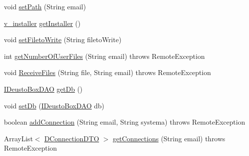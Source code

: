 \begin{DoxyCompactItemize}
\item 
void \mbox{\hyperlink{classes_1_1deusto_1_1bspq18_1_1e6_1_1_deusto_box_1_1_server_1_1remote_1_1_deusto_box_remote_service_a713a21168a4d89ed58ebfe63e4a38739}{set\+Path}} (String email)
\item 
\mbox{\hyperlink{classes_1_1deusto_1_1bspq18_1_1e6_1_1_deusto_box_1_1_server_1_1gui_1_1v__installer}{v\+\_\+installer}} \mbox{\hyperlink{classes_1_1deusto_1_1bspq18_1_1e6_1_1_deusto_box_1_1_server_1_1remote_1_1_deusto_box_remote_service_ae2e8dc87a5f16722a6bec1a6ff87ed52}{get\+Installer}} ()
\item 
void \mbox{\hyperlink{classes_1_1deusto_1_1bspq18_1_1e6_1_1_deusto_box_1_1_server_1_1remote_1_1_deusto_box_remote_service_a376f731a1b4406b3aeaa65e60e62497d}{set\+Fileto\+Write}} (String fileto\+Write)
\item 
int \mbox{\hyperlink{classes_1_1deusto_1_1bspq18_1_1e6_1_1_deusto_box_1_1_server_1_1remote_1_1_deusto_box_remote_service_a2425af40ab1d0aaa9de2954d5d841807}{get\+Number\+Of\+User\+Files}} (String email)  throws Remote\+Exception 
\item 
void \mbox{\hyperlink{classes_1_1deusto_1_1bspq18_1_1e6_1_1_deusto_box_1_1_server_1_1remote_1_1_deusto_box_remote_service_ae5c7e627a97bbc28925516e8af17fbc6}{Receive\+Files}} (String file, String email)  throws Remote\+Exception 
\item 
\mbox{\hyperlink{interfacees_1_1deusto_1_1bspq18_1_1e6_1_1_deusto_box_1_1_server_1_1jdo_1_1dao_1_1_i_deusto_box_d_a_o}{I\+Deusto\+Box\+D\+AO}} \mbox{\hyperlink{classes_1_1deusto_1_1bspq18_1_1e6_1_1_deusto_box_1_1_server_1_1remote_1_1_deusto_box_remote_service_a811146764b30a4eb510186a5386cfb9f}{get\+Db}} ()
\item 
void \mbox{\hyperlink{classes_1_1deusto_1_1bspq18_1_1e6_1_1_deusto_box_1_1_server_1_1remote_1_1_deusto_box_remote_service_a8e50775bac7b503ff10844d7c2b7fcda}{set\+Db}} (\mbox{\hyperlink{interfacees_1_1deusto_1_1bspq18_1_1e6_1_1_deusto_box_1_1_server_1_1jdo_1_1dao_1_1_i_deusto_box_d_a_o}{I\+Deusto\+Box\+D\+AO}} db)
\item 
boolean \mbox{\hyperlink{classes_1_1deusto_1_1bspq18_1_1e6_1_1_deusto_box_1_1_server_1_1remote_1_1_deusto_box_remote_service_af3b4ec328dd57b15aefff6d9112dab94}{add\+Connection}} (String email, String systema)  throws Remote\+Exception 
\item 
Array\+List$<$ \mbox{\hyperlink{classes_1_1deusto_1_1bspq18_1_1e6_1_1_deusto_box_1_1_server_1_1dto_1_1_d_connection_d_t_o}{D\+Connection\+D\+TO}} $>$ \mbox{\hyperlink{classes_1_1deusto_1_1bspq18_1_1e6_1_1_deusto_box_1_1_server_1_1remote_1_1_deusto_box_remote_service_adae22cc31bb23023630a6d333318363c}{get\+Connections}} (String email)  throws Remote\+Exception 

\end{DoxyCompactItemize}
